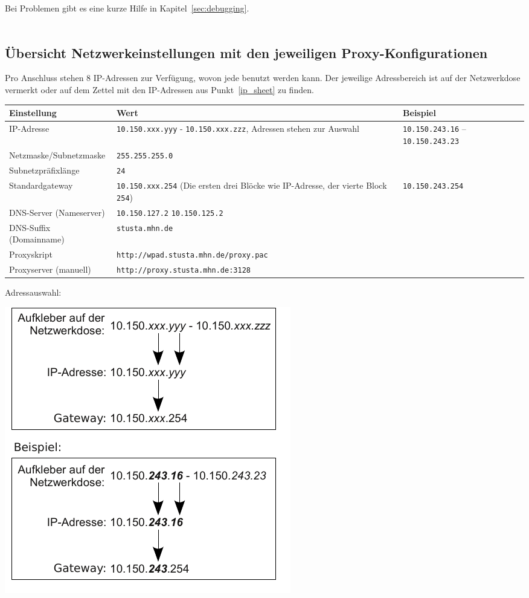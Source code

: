 \documentclass[a4paper,12pt]{scrartcl}
\begin{document}
Bei Problemen gibt es eine kurze Hilfe in Kapitel~\ref{sec:debugging}.
\\
\\
\noindent\begin{minipage}{\textwidth}

\subsection{Übersicht Netzwerkeinstellungen mit den jeweiligen Proxy-Konfigurationen}
\label{subsec:settings}
Pro Anschluss stehen 8 IP-Adressen zur Verfügung, wovon jede benutzt werden kann.
Der jeweilige Adressbereich ist auf der Netzwerkdose vermerkt oder auf dem Zettel mit den IP-Adressen aus Punkt~\ref{ip_sheet} zu finden.

\begin{center}
  \begin{tabularx}{\linewidth}{lXp{.2\linewidth}}
    \textbf{Einstellung} & \textbf{Wert} & \textbf{Beispiel} \\
    \midrule
    IP-Adresse & \nolinkurl{10.150.xxx.yyy} - \nolinkurl{10.150.xxx.zzz}, \newline 8 Adressen stehen zur Auswahl & \nolinkurl{10.150.243.16} – \nolinkurl{10.150.243.23} \\
    \hline
    Netzmaske/Subnetzmaske & \nolinkurl{255.255.255.0} & \\
    \hline
    Subnetzpräfixlänge & \nolinkurl{24} & \\
    \hline
    Standardgateway & \nolinkurl{10.150.xxx.254} \newline (Die ersten drei Blöcke wie IP-Adresse, der vierte Block \nolinkurl{254}) & \nolinkurl{10.150.243.254} \\
    \hline
    DNS-Server (Nameserver) & \nolinkurl{10.150.127.2} \newline \nolinkurl{10.150.125.2} & \\
    \hline
    DNS-Suffix (Domainname) & \nolinkurl{stusta.mhn.de} & \\
    \hline
    Proxyskript &{\nolinkurl{http://wpad.stusta.mhn.de/proxy.pac}} & \\ 
    \hline
    Proxyserver (manuell) & {\nolinkurl{http://proxy.stusta.mhn.de:3128}} & \\ 
    \bottomrule
  \end{tabularx}
\linebreak
Adressauswahl:

\includegraphics[width=0.4\linewidth,keepaspectratio]{Bilder/IP_Gerneric}
\end{center}
\end{minipage}
\end{document}
